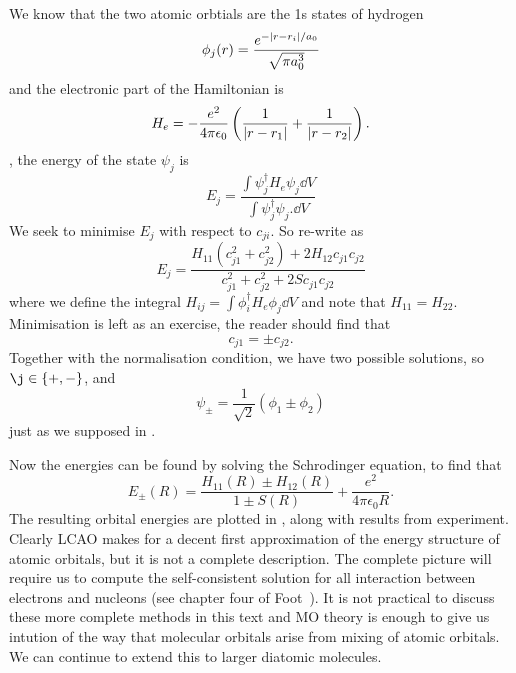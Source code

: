 
We know that the two atomic orbtials are the 1s states of hydrogen
%
\begin{equation}
  \phi_j(r) = \frac{e^{-\abs{r - r_i}/a_0}}{\sqrt{\pi a_0^3}}
\end{equation}
%
and the electronic part of the Hamiltonian is 
%
\begin{equation}
  H_e = - \frac{e^2}{4\pi\epsilon_0}\left(\frac{1}{\abs{r-r_1}} +
  \frac{1}{\abs{r-r_2}}\right).
\end{equation}
, the energy of the state $\psi_j$ is
%
\begin{equation}
  E_j = \frac{\int \psi_j^\dagger H_e \psi_j \dd V}{\int \psi_j^\dagger \psi_j.
  \dd V}
\end{equation}
%
We seek to minimise $E_j$ with respect to $c_{ji}$. So re-write as
%
\begin{equation}
  E_j = \frac{H_{11}(c_{j1}^2 + c_{j2}^2) + 2H_{12}c_{j1}c_{j2}}{c_{j1}^2
  + c_{j2}^2 + 2Sc_{j1}c_{j2}}
\end{equation}
%
where we define the integral $H_{ij} = \int \phi_i^\dagger H_e \phi_j \dd V$ and
note that $H_{11} = H_{22}$. Minimisation is left as an exercise, the reader
should find that
%
\begin{equation}
  c_{j1} = \pm c_{j2}.
\end{equation}
%
Together with the normalisation condition, we have two possible solutions, so
$\j \in \{ +, - \}$, and
%
\begin{equation}
  \psi_\pm = \frac{1}{\sqrt{2}}(\phi_1 \pm \phi_2)
\end{equation}
%
just as we supposed in .

Now the energies can be found by solving the Schrodinger equation, to find that
%
\begin{equation}
  E_\pm(R) = \frac{H_{11}(R) \pm H_{12}(R)}{1 \pm S(R)} + \frac{e^2}{4 \pi
  \epsilon_0 R}.
\end{equation}
%
The resulting orbital energies are plotted in ,
along with results from experiment. Clearly LCAO makes for a decent first
approximation of the energy structure of atomic orbitals, but it is not a
complete description. The complete picture will require us to compute the
self-consistent solution for all interaction between electrons and nucleons (see
chapter four of Foot~\cite{Foot2005}). It is not practical to discuss these more
complete methods in this text and MO theory is enough to give us intution of the
way that molecular orbitals arise from mixing of atomic orbitals. We can
continue to extend this to larger diatomic molecules.


